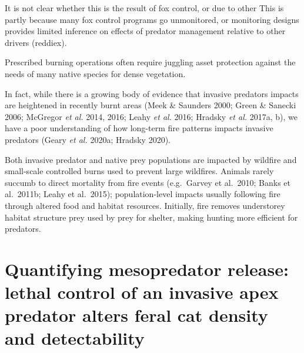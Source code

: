 \documentclass[11pt,a4paper,titlepage,twoside,openright]{style/unimelbthesis}
\begin{document}
\begin{mainmatter}
It is not clear whether this is the result of fox control, or due to other This is partly because many fox control programs go unmonitored, or monitoring designs provides limited inference on effects of predator management relative to other drivers (reddiex).

Prescribed burning operations often require juggling asset protection against the needs of many native species for dense vegetation.

In fact, while there is a growing body of evidence that invasive predators impacts are heightened in recently burnt areas (Meek \& Saunders 2000; Green \& Sanecki 2006; McGregor \emph{et al.} 2014, 2016; Leahy \emph{et al.} 2016; Hradsky \emph{et al.} 2017a, b), we have a poor understanding of how long-term fire patterns impacts invasive predators (Geary \emph{et al.} 2020a; Hradsky 2020).

Both invasive predator and native prey populations are impacted by wildfire and small-scale controlled burns used to prevent large wildfires. Animals rarely succumb to direct mortality from fire events (e.g.~Garvey et al.~2010; Banks et al.~2011b; Leahy et al.~2015); population-level impacts usually following fire through altered food and habitat resources. Initially, fire removes understorey habitat structure prey used by prey for shelter, making hunting more efficient for predators.

\hypertarget{density}{%
\chapter{Quantifying mesopredator release: lethal control of an invasive apex predator alters feral cat density and detectability}\label{density}}

\hypertarget{abstract-2}{%
}
\end{mainmatter}
\end{document}

